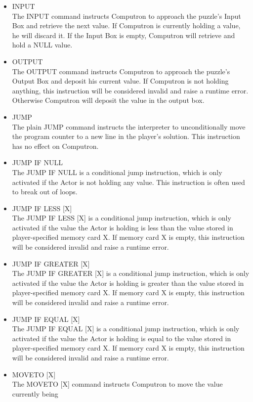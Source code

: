 \begin{itemize}
 	\item INPUT\\
	The INPUT command instructs Computron to approach the puzzle's Input Box and 
	retrieve the next value. If Computron is currently holding a value, he will discard it. 
	If the Input Box is empty, Computron will retrieve and hold a NULL value.
	\item OUTPUT\\
	The OUTPUT command instructs Computron to approach the puzzle's Output Box 
	and deposit his current value. If Computron is not holding anything, this instruction 
	will be considered invalid and raise a runtime error. Otherwise Computron will deposit 
	the value in the output box.
	\item JUMP\\
	The plain JUMP command instructs the interpreter to unconditionally move the program 
	counter to a new line in the player's solution. This instruction has no effect on Computron.
	\item JUMP IF NULL\\
	The JUMP IF NULL is a conditional jump instruction, which is only activated if the Actor
	 is not holding any value. This instruction is often used to break out of loops.
	\item JUMP IF LESS [X]\\
	The JUMP IF LESS [X] is a conditional jump instruction, which is only activated if the 
	value the Actor is holding is less than the value stored in player-specified memory card X. If 
	memory card X is empty, this instruction will be considered invalid and raise a runtime error.
	\item JUMP IF GREATER [X]\\
	The JUMP IF GREATER [X] is a conditional jump instruction, which is only activated if 
	the value the Actor is holding is greater than the value stored in player-specified memory card 
	X. If memory card X is empty, this instruction will be considered invalid and raise a runtime error.
	\item JUMP IF EQUAL [X]\\
	The JUMP IF EQUAL [X] is a conditional jump instruction, which is only activated if 
	the value the Actor is holding is equal to the value stored in player-specified memory card 
	X. If memory card X is empty, this instruction will be considered invalid and raise a runtime error.
	\item MOVETO [X]\\
	The MOVETO [X] command instructs Computron to move the value currently being 

\end{itemize}
